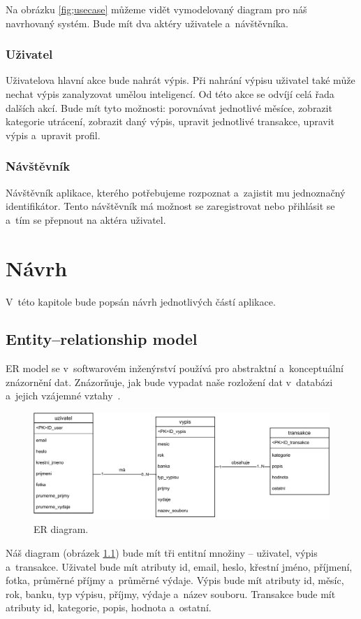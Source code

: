 Na obrázku \ref{fig;usecase} můžeme vidět vymodelovaný diagram pro náš navrhovaný systém. Bude mít dva aktéry uživatele a~návštěvníka.
\subsection*{Uživatel}
Uživatelova hlavní akce bude nahrát výpis. Při nahrání výpisu uživatel také může nechat výpis zanalyzovat umělou inteligencí. Od této akce se odvíjí celá řada dalších akcí. Bude mít tyto možnosti: porovnávat jednotlivé měsíce, zobrazit kategorie utrácení, zobrazit daný výpis, upravit jednotlivé transakce, upravit výpis a~upravit profil. 

\subsection*{Návštěvník}
Návštěvník aplikace, kterého potřebujeme rozpoznat a~zajistit mu jednoznačný identifikátor. Tento návštěvník má možnost se zaregistrovat nebo přihlásit se a~tím se přepnout na aktéra uživatel.


\chapter{Návrh}
V~této kapitole bude popsán návrh jednotlivých částí aplikace.

\section{Entity--relationship model}
ER model se v~softwarovém inženýrství používá pro abstraktní a~konceptuální znázornění dat. Znázorňuje, jak bude vypadat naše rozložení dat v~databázi a~jejich vzájemné vztahy~\cite{er_diagram}. 
\begin{figure}[H]
\centering
\includegraphics[width=\textwidth]{obrazky-figures/er_diagram.pdf}
\caption{ER diagram.}
\label{fig:erdiagram}
\end{figure}
Náš diagram (obrázek \ref{fig:erdiagram}) bude mít tři entitní množiny -- uživatel, výpis a~transakce.
Uživatel bude mít atributy id, email, heslo, křestní jméno, příjmení, fotka, průměrné příjmy a~průměrné výdaje. Výpis bude mít atributy id, měsíc, rok, banku, typ výpisu, příjmy, výdaje a~název souboru. Transakce bude mít atributy id, kategorie, popis, hodnota a~ostatní.

